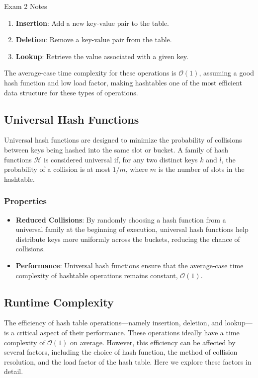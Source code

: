 \begin{examnotes}{Exam 2 Notes}
    \begin{enumerate}
        \item \textbf{Insertion}: Add a new key-value pair to the table.
        \item \textbf{Deletion}: Remove a key-value pair from the table.
        \item \textbf{Lookup}: Retrieve the value associated with a given key.
    \end{enumerate}
    
    The average-case time complexity for these operations is $\mathcal{O}(1)$, assuming a good hash function and low load factor, making hashtables one of the most efficient data structure for these 
    types of operations.
    
    \subsection*{Universal Hash Functions}
    
    Universal hash functions are designed to minimize the probability of collisions between keys being hashed into the same slot or bucket. A family of hash functions $\mathcal{H}$ is considered 
    universal if, for any two distinct keys $k$ and $l$, the probability of a collision is at most $1/m$, where $m$ is the number of slots in the hashtable.
    
    \subsubsection*{Properties}
    
    \begin{itemize}
        \item \textbf{Reduced Collisions}: By randomly choosing a hash function from a universal family at the beginning of execution, universal hash functions help distribute keys more uniformly 
        across the buckets, reducing the chance of collisions.
        \item \textbf{Performance}: Universal hash functions ensure that the average-case time complexity of hashtable operations remains constant, $\mathcal{O}(1)$.
    \end{itemize}

    \subsection*{Runtime Complexity}

    The efficiency of hash table operations—namely insertion, deletion, and lookup—is a critical aspect of their performance. These operations ideally have a time complexity of $\mathcal{O}(1)$ on 
    average. However, this efficiency can be affected by several factors, including the choice of hash function, the method of collision resolution, and the load factor of the hash table. Here we 
    explore these factors in detail.
    

\end{examnotes}

